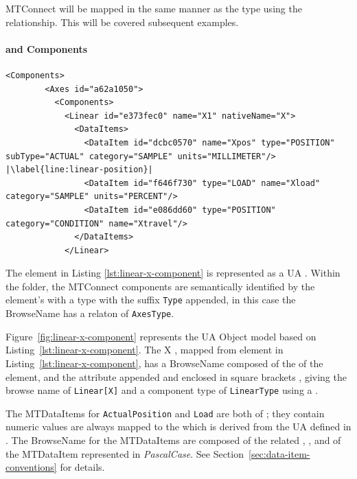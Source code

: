 MTConnect  will be mapped in the same manner as the type using the  relationship. This will be covered subsequent examples.

\FloatBarrier

\paragraph{ and  Components}

\begin{lstlisting}[firstnumber=last,escapechar=|,%
    caption={Components and Conditions},label={lst:linear-x-component}]
      <Components>
        <Axes id="a62a1050">
          <Components>
            <Linear id="e373fec0" name="X1" nativeName="X">
              <DataItems>
                <DataItem id="dcbc0570" name="Xpos" type="POSITION" subType="ACTUAL" category="SAMPLE" units="MILLIMETER"/> |\label{line:linear-position}|
                <DataItem id="f646f730" type="LOAD" name="Xload" category="SAMPLE" units="PERCENT"/>
                <DataItem id="e086dd60" type="POSITION" category="CONDITION" name="Xtravel"/>
              </DataItems>
            </Linear>
\end{lstlisting}

The  element in Listing \ref{lst:linear-x-component} is represented as a UA . Within the folder, the MTConnect components are semantically identified by the element's  with a type with the suffix \texttt{Type} appended, in this case the \gls{BrowseName}   has a  relaton of \texttt{AxesType}. 



Figure~\ref{fig:linear-x-component} represents the UA Object model based on  Listing~\ref{lst:linear-x-component}. The  X , mapped from  element in Listing~\ref{lst:linear-x-component}, has a \gls{BrowseName} composed of the  of the element, and the  attribute appended and enclosed in square brackets \element{[X]}, giving the browse name of \texttt{Linear[X]} and a component type of \texttt{LinearType} using a  .

The \glspl{MTDataItem} for \texttt{ActualPosition} and \texttt{Load} are both of  ; they contain numeric values are always mapped to the  which is derived from the UA  defined in \cite{UAPart8}. The \gls{BrowseName} for the \glspl{MTDataItem} are composed of the related  , , and  of the \gls{MTDataItem} represented in \textit{PascalCase}. See Section~\ref{sec:data-item-conventions} for details.


